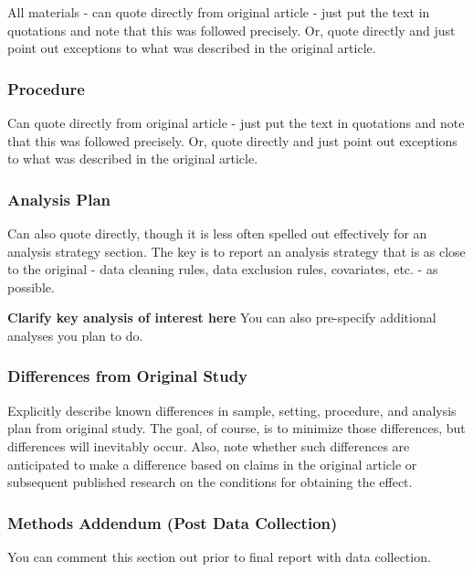 \documentclass[
  letterpaper,
  DIV=11,
  numbers=noendperiod]{scrartcl}
\begin{document}
All materials - can quote directly from original article - just put the
text in quotations and note that this was followed precisely. Or, quote
directly and just point out exceptions to what was described in the
original article.

\subsubsection{Procedure}\label{procedure}

Can quote directly from original article - just put the text in
quotations and note that this was followed precisely. Or, quote directly
and just point out exceptions to what was described in the original
article.

\subsubsection{Analysis Plan}\label{analysis-plan}

Can also quote directly, though it is less often spelled out effectively
for an analysis strategy section. The key is to report an analysis
strategy that is as close to the original - data cleaning rules, data
exclusion rules, covariates, etc. - as possible.

\textbf{Clarify key analysis of interest here} You can also pre-specify
additional analyses you plan to do.

\subsubsection{Differences from Original
Study}\label{differences-from-original-study}

Explicitly describe known differences in sample, setting, procedure, and
analysis plan from original study. The goal, of course, is to minimize
those differences, but differences will inevitably occur. Also, note
whether such differences are anticipated to make a difference based on
claims in the original article or subsequent published research on the
conditions for obtaining the effect.

\subsubsection{Methods Addendum (Post Data
Collection)}\label{methods-addendum-post-data-collection}

You can comment this section out prior to final report with data
collection.
\end{document}
